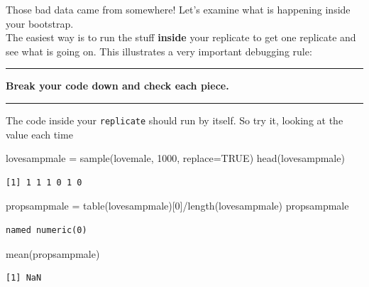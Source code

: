 \documentclass[
  letterpaper,
  DIV=11,
  numbers=noendperiod]{scrreprt}
\newenvironment{Shaded}{\begin{snugshade}}{\end{snugshade}}
\newcommand{\AttributeTok}[1]{\textcolor[rgb]{0.49,0.56,0.16}{#1}}
\newcommand{\ConstantTok}[1]{\textcolor[rgb]{0.53,0.00,0.00}{#1}}
\newcommand{\DecValTok}[1]{\textcolor[rgb]{0.25,0.63,0.44}{#1}}
\newcommand{\FunctionTok}[1]{\textcolor[rgb]{0.02,0.16,0.49}{#1}}
\newcommand{\NormalTok}[1]{\textcolor[rgb]{0.00,0.44,0.13}{#1}}
\newcommand{\OtherTok}[1]{\textcolor[rgb]{0.00,0.44,0.13}{#1}}
\newcommand{\SpecialCharTok}[1]{\textcolor[rgb]{0.25,0.44,0.63}{#1}}
\begin{document}
Those bad data came from somewhere! Let's examine what is happening
inside your bootstrap.\\
The easiest way is to run the stuff \textbf{inside} your replicate to
get one replicate and see what is going on. This illustrates a very
important debugging rule:

\bgroup \vspace{5mm}
 \noindent\rule{1ex}{1ex}%
      \textbf{Break your code down and check each piece.}%
      \rule{1ex}{1ex}
      \vspace{5mm}
\egroup

The code inside your \texttt{replicate} should run by itself. So try it,
looking at the value each time

\begin{Shaded}
\begin{Highlighting}[]
\NormalTok{  lovesampmale }\OtherTok{=} \FunctionTok{sample}\NormalTok{(lovemale, }\DecValTok{1000}\NormalTok{, }\AttributeTok{replace=}\ConstantTok{TRUE}\NormalTok{)}
  \FunctionTok{head}\NormalTok{(lovesampmale)}
\end{Highlighting}
\end{Shaded}

\begin{verbatim}
[1] 1 1 1 0 1 0
\end{verbatim}

\begin{Shaded}
\begin{Highlighting}[]
\NormalTok{  propsampmale }\OtherTok{=} \FunctionTok{table}\NormalTok{(lovesampmale)[}\DecValTok{0}\NormalTok{]}\SpecialCharTok{/}\FunctionTok{length}\NormalTok{(lovesampmale)}
\NormalTok{  propsampmale}
\end{Highlighting}
\end{Shaded}

\begin{verbatim}
named numeric(0)
\end{verbatim}

\begin{Shaded}
\begin{Highlighting}[]
  \FunctionTok{mean}\NormalTok{(propsampmale)}
\end{Highlighting}
\end{Shaded}

\begin{verbatim}
[1] NaN
\end{verbatim}
\end{document}
